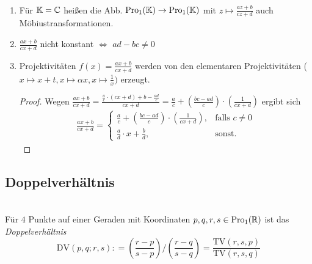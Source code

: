   \begin{bem} [Möbiustransformationen] \ \\
    \begin{enumerate}
      \item Für $\mathbb K=\mathbb C$ heißen die Abb. $\operatorname{Pro}_1(\mathbb K) \to \operatorname{Pro}_1(\mathbb K)$ mit $\displaystyle{ z\mapsto \frac{az+b}{cz+d}}$ auch Möbiustransformationen.
      \item $\displaystyle{\frac{ax+b}{cx+d}}$ nicht konstant $\Leftrightarrow$ $ad-bc \neq 0$
      \item Projektivitäten $\displaystyle{f(x) = \frac{ax+b}{cx+d}}$ werden von den elementaren Projektivitäten ($x\mapsto x+t, x\mapsto \alpha x, x\mapsto \frac{1}{x})$
            erzeugt. \par
            \begin{proof}
              Wegen $\displaystyle{\frac{ax+b}{cx+d}
              = \frac{ \frac{a}{c}\cdot (cx+d) + b - \frac{ad}{c} }{cx+d}} = \frac{a}{c} + \left( \frac{bc-ad}{c} \right) \cdot \left( \frac{1}{cx+d} \right)$ ergibt sich
              \begin{align*}
                \frac{ax+b}{cx+d}
                    = \begin{cases}
                          \frac{a}{c} + \left( \frac{bc-ad}{c} \right) \cdot \left( \frac{1}{cx+d} \right), & \mbox{falls } c\neq 0 \\
                          \frac{a}{d} \cdot x + \frac{b}{d}, & \mbox{sonst.}
                      \end{cases}
              \end{align*}
            \end{proof}
    \end{enumerate}
  \end{bem}

\subsection*{Doppelverhältnis}
  \begin{defi}[Doppelverhältnis] \ \\
    Für $4$ Punkte auf einer Geraden mit Koordinaten $p,q,r,s\in \operatorname{Pro}_1(\mathbb R)$ ist das \textit{Doppelverhältnis}
    \begin{equation*}
      \text{DV}(p,q;r,s) : = \left(\frac{r-p}{s-p}\right) \Big/ \left(\frac{r-q}{s-q}\right) = \frac{\text{TV}(r,s,p)}{\text{TV}(r,s,q)}
    \end{equation*}
  \end{defi}

